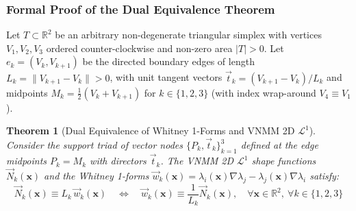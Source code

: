 \documentclass[preprint,12pt]{elsarticle}
\newtheorem{theorem}{Theorem}
\begin{document}
\subsubsection{Formal Proof of the Dual Equivalence Theorem}
\label{subsubsec:formal_proof_dual_whitney}
Let $T \subset \mathbb{R}^2$ be an arbitrary non-degenerate triangular simplex with vertices $V_1, V_2, V_3$ ordered counter-clockwise and non-zero area $|T| > 0$. Let $e_k = (V_k, V_{k+1})$ be the directed boundary edges of length $L_k = \|V_{k+1} - V_k\| > 0$, with unit tangent vectors $\vec{t}_k = (V_{k+1} - V_k)/L_k$ and midpoints $M_k = \frac{1}{2}(V_k + V_{k+1})$ for $k \in \{1, 2, 3\}$ (with index wrap-around $V_4 \equiv V_1$).

\begin{theorem}[Dual Equivalence of Whitney 1-Forms and VNMM 2D $\mathcal{L}^1$]
Consider the support triad of vector nodes $\{P_k, \vec{t}_k\}_{k=1}^3$ defined at the edge midpoints $P_k = M_k$ with directors $\vec{t}_k$. The VNMM 2D $\mathcal{L}^1$ shape functions $\vec{N}_k(\mathbf{x})$ and the Whitney 1-forms $\vec{w}_k(\mathbf{x}) = \lambda_i(\mathbf{x})\nabla\lambda_j - \lambda_j(\mathbf{x})\nabla\lambda_i$ satisfy:
\begin{equation}
\vec{N}_k(\mathbf{x}) \equiv L_k \, \vec{w}_k(\mathbf{x}) \quad \Longleftrightarrow \quad \vec{w}_k(\mathbf{x}) \equiv \frac{1}{L_k} \vec{N}_k(\mathbf{x}), \quad \forall \mathbf{x} \in \mathbb{R}^2, \ \forall k \in \{1, 2, 3\}
\label{eq:dual_equivalence_scaling}
\end{equation}
\end{theorem}
\end{document}
